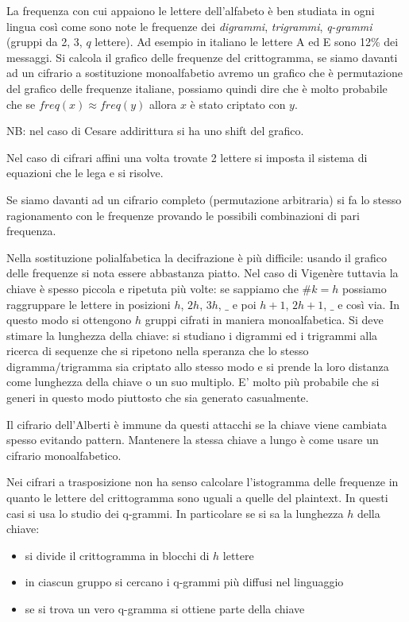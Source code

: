 La frequenza con cui appaiono le lettere dell'alfabeto è ben studiata in ogni lingua così come sono note le frequenze dei \emph{digrammi}, \emph{trigrammi}, \emph{q-grammi} (gruppi da 2, 3, $q$ lettere). Ad esempio in italiano le lettere A ed E sono 12\% dei messaggi. Si calcola il grafico delle frequenze del crittogramma, se siamo davanti ad un cifrario a sostituzione monoalfabetio avremo un grafico che è permutazione del grafico delle frequenze italiane, possiamo quindi dire che è molto probabile che se $freq\left(x\right) \approx freq\left(y\right)$ allora $x$ è stato criptato con $y$.

NB: nel caso di Cesare addirittura si ha uno shift del grafico.

Nel caso di cifrari affini una volta trovate 2 lettere si imposta il sistema di equazioni che le lega e si risolve.

Se siamo davanti ad un cifrario completo (permutazione arbitraria) si fa lo stesso ragionamento con le frequenze provando le possibili combinazioni di pari frequenza.

Nella sostituzione polialfabetica la decifrazione è più difficile: usando il grafico delle frequenze si nota essere abbastanza piatto. Nel caso di Vigenère tuttavia la chiave è spesso piccola e ripetuta più volte: se sappiamo che $\#k=h$ possiamo raggruppare le lettere in posizioni $h$, $2h$, $3h$, $\_$ e poi $h+1$, $2h+1$, $\_$ e così via. In questo modo si ottengono $h$ gruppi cifrati in maniera monoalfabetica. Si deve stimare la lunghezza della chiave: si studiano i digrammi ed i trigrammi alla ricerca di sequenze che si ripetono nella speranza che lo stesso digramma/trigramma sia criptato allo stesso modo e si prende la loro distanza come lunghezza della chiave o un suo multiplo. E' molto più probabile che si generi in questo modo piuttosto che sia generato casualmente.

Il cifrario dell'Alberti è immune da questi attacchi se la chiave viene cambiata spesso evitando pattern. Mantenere la stessa chiave a lungo è come usare un cifrario monoalfabetico.

Nei cifrari a trasposizione non ha senso calcolare l'istogramma delle frequenze in quanto le lettere del crittogramma sono uguali a quelle del plaintext. In questi casi si usa lo studio dei q-grammi. In particolare se si sa la lunghezza $h$ della chiave:
\begin{itemize}
    \item si divide il crittogramma in blocchi di $h$ lettere
    \item in ciascun gruppo si cercano i q-grammi più diffusi nel linguaggio
    \item se si trova un vero q-gramma si ottiene parte della chiave
\end{itemize}

